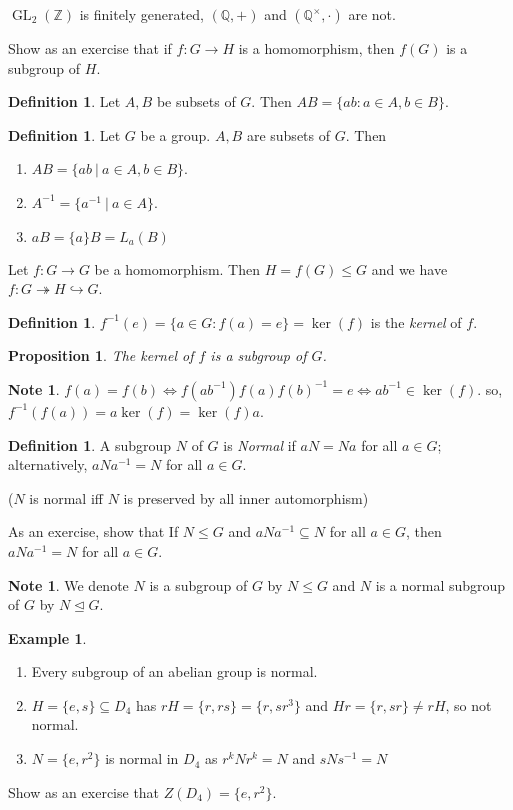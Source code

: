 \documentclass{amsart}
\newtheorem{prop}[thm]{Proposition}
\theoremstyle{definition}
\newtheorem{definition}[thm]{Definition}
\newtheorem{example}[thm]{Example}
\newtheorem{note}[thm]{Note}
\newcommand{\Q}{\mathbb Q}
\newcommand{\Z}{\mathbb Z}
\DeclareMathOperator{\GL}{GL}
\begin{document}
$\GL_2(\Z)$ is finitely generated, $(\Q,+)$ and $(\Q^\times,\cdot)$ are not.

Show as an exercise that if $f:G\to H$ is a homomorphism, then $f(G)$ is a subgroup of $H$.
\begin{definition}
	Let $A,B$ be subsets of $G$. Then $AB=\{ab:a\in A,b\in B\}$.
	
\end{definition}
\begin{definition}
	Let $G$ be a group. $A,B$ are subsets of $G$. Then
	\begin{enumerate}
		\item $AB=\{ab\ |\ a\in A,b\in B\}$.
		\item $A^{-1}=\{a^{-1}\ |\ a\in A\}$.
		\item $aB=\{a\}B=L_a(B)$
	\end{enumerate}
\end{definition}

Let $f:G\to G$ be a homomorphism. Then $H=f(G)\leq G$ and we have $f:G\twoheadrightarrow H\hookrightarrow G$.

\begin{definition}
	$f^{-1}(e)=\{a\in G:f(a)=e\}=\ker(f)$ is the \emph{kernel} of $f$.
\end{definition}
\begin{prop}
	The kernel of $f$ is a subgroup of $G$.
\end{prop}
\begin{note}
	$f(a)=f(b)\iff f(ab^{-1})f(a)f(b)^{-1}=e\iff ab^{-1}\in\ker(f)$. so, $f^{-1}(f(a))=a\ker(f)=\ker (f)a$.
\end{note}
\begin{definition}
	A subgroup $N$ of $G$ is \emph{Normal} if $aN=Na$ for all $a\in G$; alternatively, $aNa^{-1}=N$ for all $a\in G$.
	
	($N$ is normal iff $N$ is preserved by all inner automorphism)
\end{definition}
As an exercise, show that If $N\leq G$ and $aNa^{-1}\subseteq N$ for all $a\in G$, then $aNa^{-1}=N$ for all $a\in G$.
\begin{note}
We denote $N$ is a subgroup of $G$ by $N\leq G$ and $N$ is a normal subgroup of $G$ by $N\unlhd G$. 
\end{note}
\begin{example}
	\begin{enumerate}
		\item Every subgroup of an abelian group is normal.
		\item $H=\{e,s\}\subseteq D_4$ has $rH=\{r,rs\}=\{r,sr^3\}$ and $Hr=\{r,sr\}\not=rH$, so not normal.
		\item $N=\{e,r^2\}$ is normal in $D_4$ as $r^kNr^k=N$ and $sNs^{-1}=N$
	\end{enumerate}
\end{example}
Show as an exercise that $Z(D_4)=\{e,r^2\}$.
\end{document}

